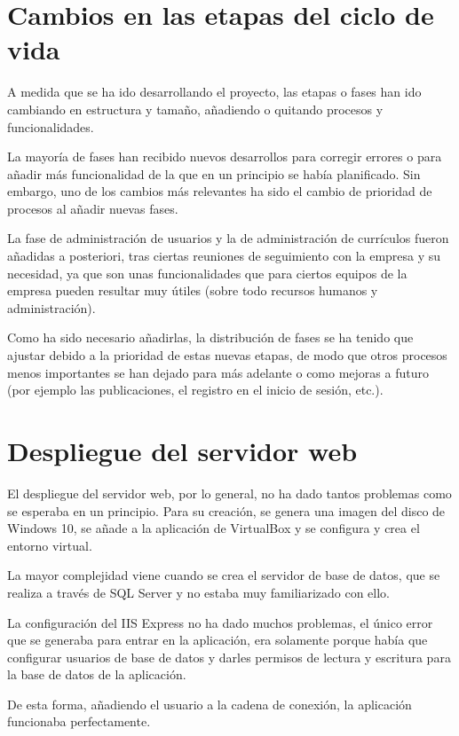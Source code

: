 \section{Cambios en las etapas del ciclo de vida}
A medida que se ha ido desarrollando el proyecto, las etapas o fases han ido cambiando en estructura y tamaño, añadiendo o quitando procesos y funcionalidades.

La mayoría de fases han recibido nuevos desarrollos para corregir errores o para añadir más funcionalidad de la que en un principio se había planificado. Sin embargo, uno de los cambios más relevantes ha sido el cambio de prioridad de procesos al añadir nuevas fases.

La fase de administración de usuarios y la de administración de currículos fueron añadidas a posteriori, tras ciertas reuniones de seguimiento con la empresa y su necesidad, ya que son unas funcionalidades que para ciertos equipos de la empresa pueden resultar muy útiles (sobre todo recursos humanos y administración).

Como ha sido necesario añadirlas, la distribución de fases se ha tenido que ajustar debido a la prioridad de estas nuevas etapas, de modo que otros procesos menos importantes se han dejado para más adelante o como mejoras a futuro (por ejemplo las publicaciones, el registro en el inicio de sesión, etc.).

\section{Despliegue del servidor web}
El despliegue del servidor web, por lo general, no ha dado tantos problemas como se esperaba en un principio. Para su creación, se genera una imagen del disco de Windows 10, se añade a la aplicación de VirtualBox y se configura y crea el entorno virtual.

La mayor complejidad viene cuando se crea el servidor de base de datos, que se realiza a través de SQL Server y no estaba muy familiarizado con ello.

La configuración del IIS Express no ha dado muchos problemas, el único error que se generaba para entrar en la aplicación, era solamente porque había que configurar usuarios de base de datos y darles permisos de lectura y escritura para la base de datos de la aplicación.

De esta forma, añadiendo el usuario a la cadena de conexión, la aplicación funcionaba perfectamente.